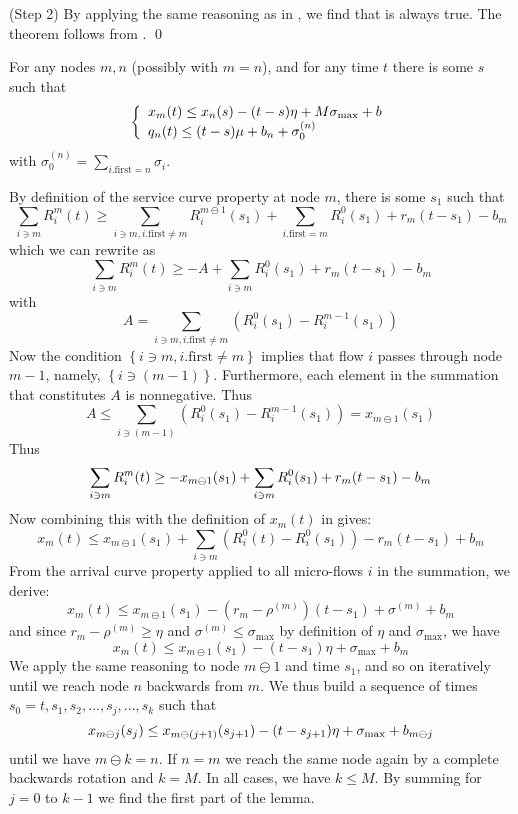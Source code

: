 (Step 2) By applying the same reasoning as in
, we find that  is always
true. The theorem follows from . \qed
\begin{lemma}
 For any nodes $m, n$ (possibly with $m = n$), and for any time $t$ there is
 some $s$ such that
 $$
 \left\{\begin{array}{l} 
 x_m(t) \leq  x_n (s)-  (t-s) \eta + M \sigma_{\max} + b\\
 q_n(t) \leq  (t-s)\mu  + b_n + \sigma^{(n)}_0
  \end{array} \right.
 $$
 with $\sigma^{(n)}_0=\sum_{i.\mathrm{first}=n}\sigma_i$.
\end{lemma}
\pr By definition of the service curve property at node $m$, there
is some $s_1$ such that
$$
   \sum_{i \ni m} R^m_i(t) \geq
   \sum_{i \ni m, i.\mathrm{first} \neq
m} R^{m \ominus 1}_i(s_1) + \sum_{i.\mathrm{first} = m} R^0_i(s_1)
 + r_m(t-s_1) - b_m $$
 which we can rewrite as
 $$
\sum_{i \ni m} R^m_i(t) \geq -A
    + \sum_{i \ni m} R^0_i(s_1)
+ r_m(t-s_1) - b_m
$$
with
  $$
   A = \sum_{i \ni m, i.\mathrm{first} \neq m}
  \left(R^0_i(s_1)-R^{m-1}_i(s_1)\right)
  $$
Now the condition $\left\{i \ni m, i.\mathrm{first} \neq
m\right\}$
 implies that flow $i$ passes through node $m-1$, namely, $\left\{i \ni
 (m-1)\right\}$. Furthermore, each element in the summation that
 constitutes
 $A$ is nonnegative. Thus
 $$A \leq \sum_{i \ni
 (m-1)}  \left(R^0_i(s_1)-R^{m-1}_i(s_1)\right) = x_{m \ominus 1} (s_1)
 $$
Thus
\begin{equation}\mylabel{eq-fifolem23}
  \sum_{i \ni m} R^m_i(t) \geq -x_{m \ominus 1} (s_1) + \sum_{i \ni m} R^0_i(s_1)
+ r_m(t-s_1) - b_m
\end{equation}
Now combining this with the definition of $x_m(t)$ in
 gives:
$$
x_m(t) \leq  x_{m \ominus 1} (s_1) + \sum_{i \ni m}
\left(R^0_i(t)-R^0_i(s_1)\right) - r_m(t-s_1) + b_m
$$
From the arrival curve property applied to all micro-flows $i$ in
the summation, we derive:
$$
x_m(t) \leq  x_{m \ominus 1} (s_1)- (r_m - \rho^{(m)}) (t-s_1) +
\sigma^{(m)} + b_m
$$
and since $r_m - \rho^{(m)} \geq \eta$ and $\sigma^{(m)} \leq
\sigma_{\max}$ by definition of $\eta$ and $\sigma_{\max}$, we
have
 $$
x_m(t) \leq  x_{m \ominus 1} (s_1)-  (t-s_1) \eta + \sigma_{\max}
+ b_m
 $$
 We apply the same reasoning to node $m \ominus 1$ and
time $s_1$, and so on iteratively until we reach node $n$
backwards from $m$. We thus build a sequence of times $s_0=t,s_1,
s_2, ..., s_j,  ..., s_k$ such that
\begin{equation}\mylabel{eq-fifolem893}
  x_{m \ominus j}(s_j) \leq  x_{m \ominus (j+1)} (s_{j+1})-
(t-s_{j+1}) \eta + \sigma_{\max} + b_{m \ominus j}
\end{equation}
until we have $m \ominus k= n$. If $n=m$ we reach the same node
again by a complete backwards rotation and $k=M$. In all cases, we
have $k \leq M$. By summing  for $j=0$ to
$k-1$ we find the first part of the lemma.

